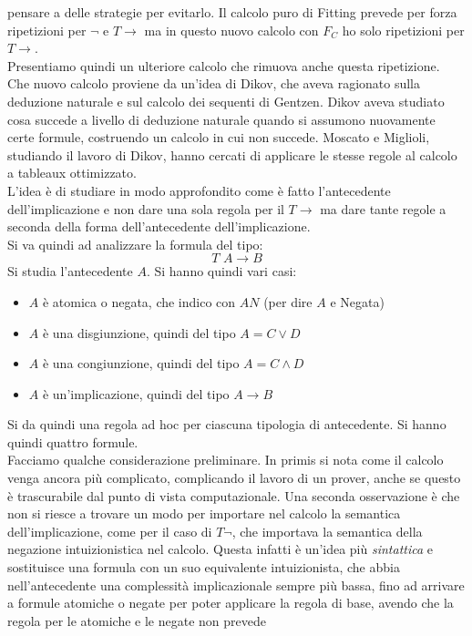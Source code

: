 \documentclass[a4paper,12pt, oneside]{book}
\begin{document}
pensare a delle strategie per evitarlo. Il calcolo puro di Fitting prevede per
forza ripetizioni per $\neg$ e $T\to$ ma in questo nuovo calcolo con $F_C$ ho
solo ripetizioni per $T\to$.\\ 
Presentiamo quindi un ulteriore calcolo che rimuova anche questa ripetizione.\\
Che nuovo calcolo proviene da un'idea di Dikov, che aveva ragionato sulla
deduzione naturale e sul calcolo dei sequenti di Gentzen. Dikov aveva studiato
cosa succede a livello di deduzione naturale quando si assumono nuovamente certe
formule, costruendo un calcolo in cui non succede. Moscato e Miglioli, studiando
il lavoro di Dikov, hanno cercati di applicare le stesse regole al calcolo a
tableaux ottimizzato. \\
L'idea è di studiare in modo approfondito come è fatto l'antecedente
dell'implicazione e non dare una sola regola per il $T\to$ ma dare tante regole
a seconda della forma dell'antecedente dell'implicazione.\\
Si va quindi ad analizzare la formula del tipo:
\[T\,\, A\to B\]
Si studia l'antecedente $A$. Si hanno quindi vari casi:
\begin{itemize}
  \item $A$ è atomica o negata, che indico con $AN$ (per dire $A$ e Negata)
  \item $A$ è una disgiunzione, quindi del tipo $A=C\lor D$
  \item $A$ è una congiunzione, quindi del tipo $A=C\land D$
  \item $A$ è un'implicazione, quindi del tipo $A\to B$
\end{itemize}
Si da quindi una regola ad hoc per ciascuna tipologia di antecedente. Si hanno
quindi quattro formule.\\
Facciamo qualche considerazione preliminare. In primis si nota come il calcolo
venga ancora più complicato, complicando il lavoro di un prover, anche se questo
è trascurabile dal punto di vista computazionale. Una seconda osservazione è che
non si riesce a trovare un modo per importare nel calcolo la semantica
dell'implicazione, come per il caso di $T\neg$, che importava la semantica della
negazione intuizionistica nel calcolo. Questa infatti è un'idea più
\textit{sintattica} e sostituisce una formula con un suo equivalente
intuizionista, che abbia nell'antecedente una complessità implicazionale sempre
più bassa, fino ad arrivare a formule atomiche o negate per poter applicare la
regola di base, avendo che la regola per le atomiche e le negate non prevede
\end{document}
